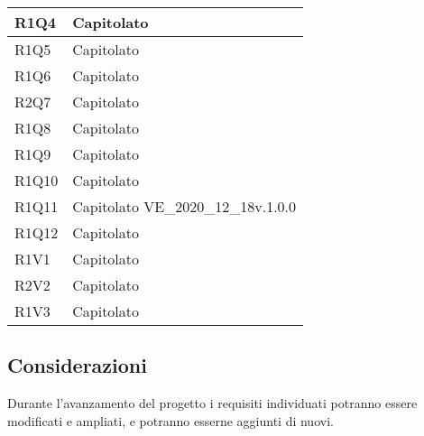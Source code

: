 \begin{center}
\begin{longtable}{|p{22mm}|p{44mm}|}
R1Q4 &
Capitolato 
\\
\hline

R1Q5 &
Capitolato 
\\
\hline

R1Q6 &
Capitolato 
\\
\hline

R2Q7 &
Capitolato 
\\
\hline

R1Q8 &
Capitolato 
\\
\hline

R1Q9 &
Capitolato 
\\
\hline

R1Q10 &
Capitolato 
\\
\hline

R1Q11 &
Capitolato \newline
VE\_2020\_12\_18v.1.0.0 
\\
\hline

R1Q12 &
Capitolato 
\\
\hline

R1V1 &
Capitolato 
\\
\hline

R2V2 &
Capitolato 
\\
\hline

R1V3 &
Capitolato 
\\
\hline%
		
	\end{longtable}
\end{center}

\subsection{Considerazioni}
Durante l'avanzamento del progetto i requisiti individuati potranno essere modificati e ampliati, e potranno esserne aggiunti di nuovi.
